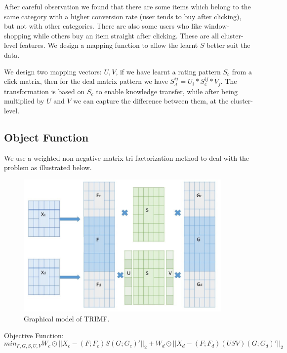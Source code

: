 \par{After careful observation we found that there are some items which belong to the same category with a higher conversion rate (user tends to buy after clicking), but not with other categories. There are also some users who like window-shopping while others buy an item straight after clicking. These are all cluster-level features. We design a mapping function to allow the learnt $S$ better suit the data.

We design two mapping vectors: $U,V$, if we have learnt a rating pattern $S_c$ from a click matrix, then for the deal matrix pattern we have $S_d^{ij} = U_i * S_c^{ij} * V_j$. The transformation is based on $S_c$ to enable knowledge transfer, while after being multiplied by $U$ and $V$ we can capture the difference between them, at the cluster-level. }

\subsection{Object Function}
\par{We use a weighted non-negative matrix tri-factorization method to deal with the problem as illustrated below. 
\begin{figure}


\begin{center}
\includegraphics[width=400px]{fig/trimf.jpg} 
\caption{Graphical model of TRIMF.}
\label{fig:trimf}
\end{center}
\end{figure}}
 
  \par{Objective Function:$$min_{F,G,S,U,V} W_c\odot ||X_c - (F;F_c)S(G;G_c)'||_2 + W_d\odot ||X_d - (F;F_d)(USV)(G;G_d)'||_2 $$}

